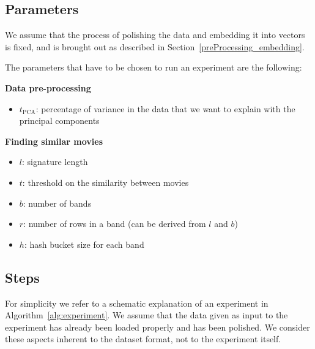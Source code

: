 \subsection{Parameters}\label{experiments_parameters}
We assume that the process of polishing the data and embedding it into vectors is fixed, and is brought out as described in Section~\ref{preProcessing_embedding}.

The parameters that have to be chosen to run an experiment are the following:
\begin{description}
    \item \textbf{Data pre-processing}
    \begin{itemize}
        \item $t_\text{PCA}$: percentage of variance in the data that we want to explain with the principal components
    \end{itemize}
    \item \textbf{Finding similar movies}
    \begin{itemize}
        \item $l$: signature length
        \item $t$: threshold on the similarity between movies
        \item $b$: number of bands
        \item $r$: number of rows in a band (can be derived from $l$ and $b$)
        \item $h$: hash bucket size for each band
    \end{itemize}
\end{description}

\subsection{Steps}\label{experiments_steps}
For simplicity we refer to a schematic explanation of an experiment in Algorithm~\ref{alg:experiment}. We assume that the data given as input to the experiment has already been loaded properly and has been polished. We consider these aspects inherent to the dataset format, not to the experiment itself.

